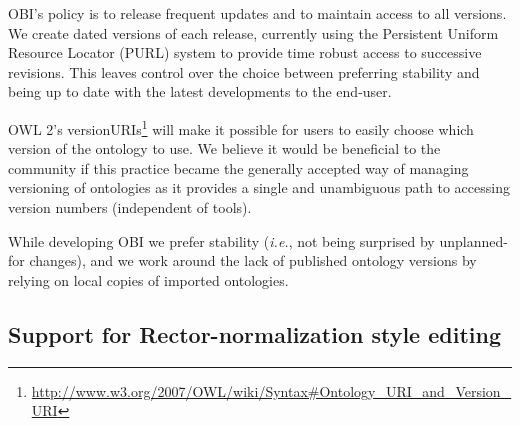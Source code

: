 \documentclass{elsart}       %
\begin{document}
OBI's policy is to release frequent updates and to maintain access to all versions.
We create dated versions of each release, currently using the Persistent Uniform Resource Locator (PURL)\cite{purl} system to provide time robust access to successive revisions.
This leaves control over the choice between preferring stability and being up to date with the latest developments to the end-user.

OWL 2's versionURIs\footnote{\url{http://www.w3.org/2007/OWL/wiki/Syntax#Ontology_URI_and_Version_URI}} will make it possible for users to easily choose which version of the ontology to use.
We believe it would be beneficial to the community if this practice became the generally accepted way of managing versioning of ontologies as it provides a single and unambiguous path to accessing version numbers (independent of tools). 

While developing OBI we prefer stability (\emph{i.e.}, not being surprised by unplanned-for changes), and we work around the lack of published ontology versions by relying on local copies of imported ontologies.

\subsection{Support for Rector-normalization style editing}
\end{document}
